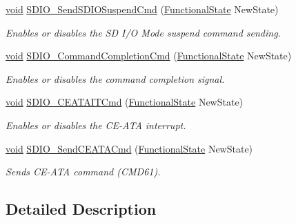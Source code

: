 \begin{DoxyCompactItemize}
\hyperlink{usb__devapi_8h_afabf60e7f57651d6d595a02c75f07cd0}{void} \hyperlink{group___s_d_i_o___exported___functions_ga9264137a01a1ab81d03bc80a3b3120fc}{S\+D\+I\+O\+\_\+\+Send\+S\+D\+I\+O\+Suspend\+Cmd} (\hyperlink{agilefox_2library_2inc_2stm32f10x__type_8h_ac9a7e9a35d2513ec15c3b537aaa4fba1}{Functional\+State} New\+State)
\begin{DoxyCompactList}\small\item\em Enables or disables the SD I/O Mode suspend command sending. \end{DoxyCompactList}\item 
\hyperlink{usb__devapi_8h_afabf60e7f57651d6d595a02c75f07cd0}{void} \hyperlink{group___s_d_i_o___exported___functions_ga1bbe98c629812bc62121d9c8b2c5e21b}{S\+D\+I\+O\+\_\+\+Command\+Completion\+Cmd} (\hyperlink{agilefox_2library_2inc_2stm32f10x__type_8h_ac9a7e9a35d2513ec15c3b537aaa4fba1}{Functional\+State} New\+State)
\begin{DoxyCompactList}\small\item\em Enables or disables the command completion signal. \end{DoxyCompactList}\item 
\hyperlink{usb__devapi_8h_afabf60e7f57651d6d595a02c75f07cd0}{void} \hyperlink{group___s_d_i_o___exported___functions_gab44b8cbc21be000a291563076159503b}{S\+D\+I\+O\+\_\+\+C\+E\+A\+T\+A\+I\+T\+Cmd} (\hyperlink{agilefox_2library_2inc_2stm32f10x__type_8h_ac9a7e9a35d2513ec15c3b537aaa4fba1}{Functional\+State} New\+State)
\begin{DoxyCompactList}\small\item\em Enables or disables the C\+E-\/\+A\+TA interrupt. \end{DoxyCompactList}\item 
\hyperlink{usb__devapi_8h_afabf60e7f57651d6d595a02c75f07cd0}{void} \hyperlink{group___s_d_i_o___exported___functions_ga8dc7f17804bdb745b42f6647c8487b4c}{S\+D\+I\+O\+\_\+\+Send\+C\+E\+A\+T\+A\+Cmd} (\hyperlink{agilefox_2library_2inc_2stm32f10x__type_8h_ac9a7e9a35d2513ec15c3b537aaa4fba1}{Functional\+State} New\+State)
\begin{DoxyCompactList}\small\item\em Sends C\+E-\/\+A\+TA command (C\+M\+D61). \end{DoxyCompactList}\end{DoxyCompactItemize}


\subsection{Detailed Description}


